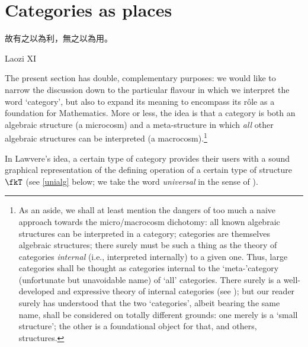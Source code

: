 \section{Categories as places}\label{as_places}
\epigraph{\begin{CJK}{UTF8}{bsmi} 故有之以為利，無之以為用。 \end{CJK}}{Laozi XI}
The present section has double, complementary purposes: we would like to narrow the discussion down to the particular flavour in which we interpret the word `category', but also to expand its meaning to encompass its r\^ole as a foundation for Mathematics. More or less, the idea is that a category is both an algebraic structure (a microcosm) and a meta\hyp{}structure in which \emph{all} other algebraic structures can be interpreted (a macrocosm).\footnote{As an aside, we shall at least mention the dangers of too much a naive approach towards the micro/macrocosm dichotomy: all known algebraic structures can be interpreted in a category; categories are themselves algebraic structures; there surely must be such a thing as the theory of categories \emph{internal} (i.e., interpreted internally) to a given one. Thus, large categories shall be thought as categories internal to the `meta-'category (unfortunate but unavoidable name) of `all' categories. There surely is a well-developed and expressive theory of internal categories (see \cite[Ch. 8]{Bor1}); but our reader surely has understood that the two `categories', albeit bearing the same name, shall be considered on totally different grounds: one merely is a `small structure'; the other is a foundational object for that, and others, structures.}

In Lawvere's idea, a certain type of category provides their users with a sound graphical representation of the defining operation of a certain type of structure $\fkT$ (see \autoref{unialg} below; we take the word \emph{universal} in the sense of \cite[XV.1]{grillet2007abstract}).

